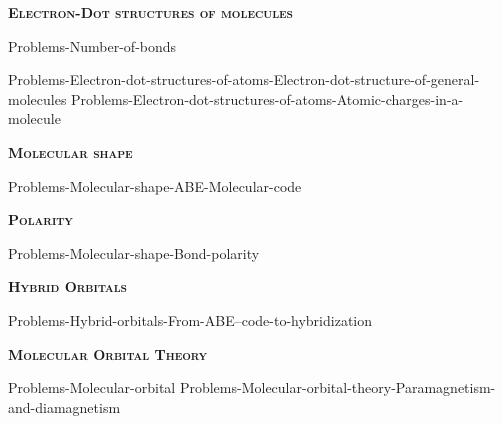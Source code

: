 \documentclass[main.tex]{subfiles}
\newcommand\chapterlabel{Ch-electronicstructure}
\begin{document}
\newpage
\setdoublesep{0.35700 em}  %
\setatomsep{1.78500 em}    %
\setbondoffset{0.18265 em} %
\renewcommand{\bondwidth}{0.06642 em} %
\setbondstyle{line width = \bondwidth}
\fancyhfoffset[E,O]{0pt}
\setlength{\columnsep}{30pt}
\begin{conclusion}
\end{conclusion}






\begin{multicols*}{2}\setcounter{numA}{1}  

{\raggedright\textsc{\textbf{Electron-Dot structures of molecules }}\par}

{Problems-Number-of-bonds}



{Problems-Electron-dot-structures-of-atoms-Electron-dot-structure-of-general-molecules}
{Problems-Electron-dot-structures-of-atoms-Atomic-charges-in-a-molecule}
{\raggedright\textsc{\textbf{Molecular shape}}\par}
{Problems-Molecular-shape-ABE-Molecular-code}


{\raggedright\textsc{\textbf{Polarity}}\par}
{Problems-Molecular-shape-Bond-polarity}
{\raggedright\textsc{\textbf{Hybrid Orbitals}}\par}
{Problems-Hybrid-orbitals-From-ABE--code-to-hybridization}
{\raggedright\textsc{\textbf{Molecular Orbital Theory}}\par}
{Problems-Molecular-orbital}
{Problems-Molecular-orbital-theory-Paramagnetism-and-diamagnetism}


 


\end{multicols*} \iftoggle{showfinalanswers}{
\newpage\fancyhfoffset[E,O]{0pt}
\begin{answerbox}
\begin{answersenvironment}
 \begin{localsize}{10}
{ \checkoddpage\ifoddpage    \else   \clearpage\thispagestyle{empty}\mbox{}\clearpage\fi
\Large \bf Answers}
\SetupExSheets{ headings = inline-nr , counter-format = qu) ,}
\printsolutions 
  \vspace{20cm}
 \end{localsize}
 \end{answersenvironment}
\end{answerbox}
}{}
\checkoddpage\ifoddpage   \clearpage\thispagestyle{empty}\mbox{}\clearpage \else   \fi
\end{document}
